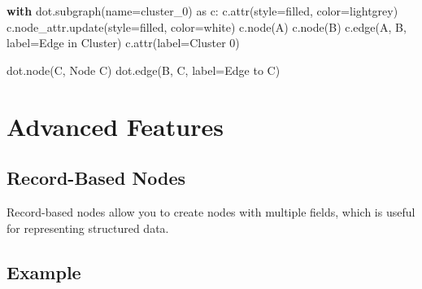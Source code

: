 \documentclass[
  letterpaper,
  DIV=11,
  numbers=noendperiod]{scrreprt}
\newenvironment{Shaded}{\begin{snugshade}}{\end{snugshade}}
\newcommand{\ControlFlowTok}[1]{\textcolor[rgb]{0.00,0.23,0.31}{\textbf{#1}}}
\newcommand{\ImportTok}[1]{\textcolor[rgb]{0.00,0.46,0.62}{#1}}
\newcommand{\NormalTok}[1]{\textcolor[rgb]{0.00,0.23,0.31}{#1}}
\newcommand{\OperatorTok}[1]{\textcolor[rgb]{0.37,0.37,0.37}{#1}}
\newcommand{\StringTok}[1]{\textcolor[rgb]{0.13,0.47,0.30}{#1}}
\begin{document}
\begin{Shaded}
\begin{Highlighting}[]
\ControlFlowTok{with}\NormalTok{ dot.subgraph(name}\OperatorTok{=}\StringTok{\textquotesingle{}cluster\_0\textquotesingle{}}\NormalTok{) }\ImportTok{as}\NormalTok{ c:}
\NormalTok{    c.attr(style}\OperatorTok{=}\StringTok{\textquotesingle{}filled\textquotesingle{}}\NormalTok{, color}\OperatorTok{=}\StringTok{\textquotesingle{}lightgrey\textquotesingle{}}\NormalTok{)}
\NormalTok{    c.node\_attr.update(style}\OperatorTok{=}\StringTok{\textquotesingle{}filled\textquotesingle{}}\NormalTok{, color}\OperatorTok{=}\StringTok{\textquotesingle{}white\textquotesingle{}}\NormalTok{)}
\NormalTok{    c.node(}\StringTok{\textquotesingle{}A\textquotesingle{}}\NormalTok{)}
\NormalTok{    c.node(}\StringTok{\textquotesingle{}B\textquotesingle{}}\NormalTok{)}
\NormalTok{    c.edge(}\StringTok{\textquotesingle{}A\textquotesingle{}}\NormalTok{, }\StringTok{\textquotesingle{}B\textquotesingle{}}\NormalTok{, label}\OperatorTok{=}\StringTok{\textquotesingle{}Edge in Cluster\textquotesingle{}}\NormalTok{)}
\NormalTok{    c.attr(label}\OperatorTok{=}\StringTok{\textquotesingle{}Cluster 0\textquotesingle{}}\NormalTok{)}

\NormalTok{dot.node(}\StringTok{\textquotesingle{}C\textquotesingle{}}\NormalTok{, }\StringTok{\textquotesingle{}Node C\textquotesingle{}}\NormalTok{)}
\NormalTok{dot.edge(}\StringTok{\textquotesingle{}B\textquotesingle{}}\NormalTok{, }\StringTok{\textquotesingle{}C\textquotesingle{}}\NormalTok{, label}\OperatorTok{=}\StringTok{\textquotesingle{}Edge to C\textquotesingle{}}\NormalTok{)}
\end{Highlighting}
\end{Shaded}

\section{Advanced Features}\label{advanced-features-1}

\subsection{Record-Based Nodes}\label{record-based-nodes}

Record-based nodes allow you to create nodes with multiple fields, which
is useful for representing structured data.

\subsection{Example}\label{example-48}
\end{document}

